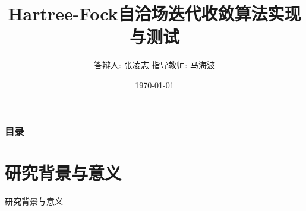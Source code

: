 \documentclass[10pt,aspectratio=43,mathserif,UTF8]{beamer}
\title{Hartree-Fock自洽场迭代收敛算法实现与测试
} %
\author{答辩人: 张凌志 \newline \newline 指导教师: 马海波} %
\institute %
{
南京大学化学化工学院 \\ %
\medskip
}
\date{\today} %
\begin{document}
\begin{frame}
\titlepage %
\end{frame}

\begin{frame}
\frametitle{目录} %
\tableofcontents %
\end{frame}


\section{研究背景与意义} %

\begin{frame}
	\Huge{\centerline{研究背景与意义}}
\end{frame}


%
\end{document}
